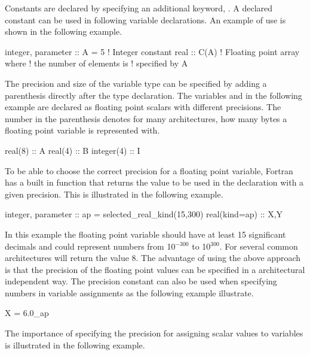 Constants are declared by specifying an additional keyword, . A declared constant can be used in following variable declarations. An example of use is shown in the following example.

\begin{fortrancodeenv}
integer, parameter :: A = 5 ! Integer constant
real :: C(A)                ! Floating point array where
                            ! the number of elements is
                            ! specified by A
\end{fortrancodeenv}

The precision and size of the variable type can be specified by adding a parenthesis directly after the type declaration. The variables  and  in the following example are declared as floating point scalars with different precisions. The number in the parenthesis denotes for many architectures, how many bytes a floating point variable is represented with.

\begin{fortrancodeenv}
real(8) :: A
real(4) :: B
integer(4) :: I
\end{fortrancodeenv}

To be able to choose the correct precision for a floating point variable, Fortran has a built in function  that returns the value to be used in the declaration with a given precision. This is illustrated in the following example.

\begin{fortrancodeenv}
integer, parameter :: ap = selected_real_kind(15,300)
real(kind=ap) :: X,Y
\end{fortrancodeenv}

In this example the floating point variable should have at least 15 significant decimals and could represent numbers from 10$^{-300}$ to 10$^{300}$. For several common architectures  will return the value 8. The advantage of using the above approach is that the precision of the floating point values can be specified in a architectural independent way. The precision constant can also be used when
specifying numbers in variable assignments as the following example illustrate.

\begin{fortrancodeenv}
X = 6.0_ap
\end{fortrancodeenv}

The importance of specifying the precision for assigning scalar values to variables is illustrated in the following example.

